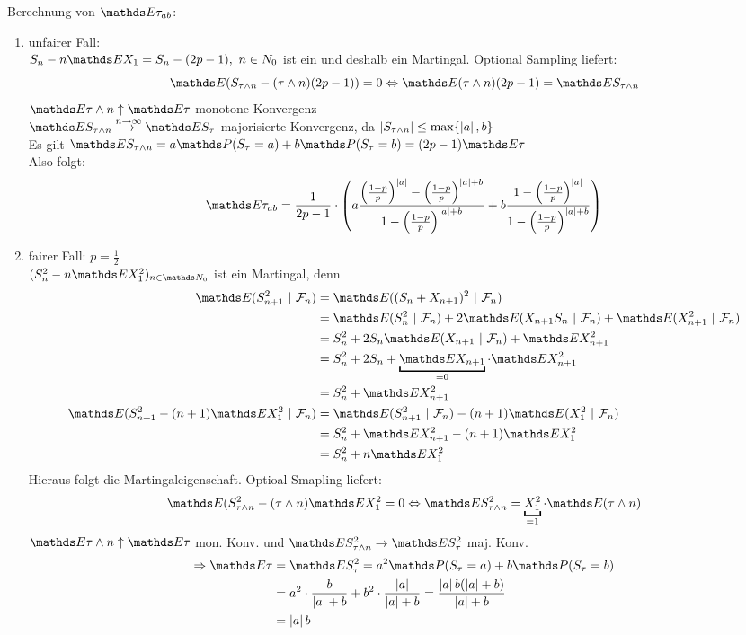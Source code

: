 \begin{enumerate}
	Berechnung von $\E \tau_{ab}$:\\
	\begin{enumerate}[(1)]
		\item unfairer Fall:\\
		$S_n-n\E X_1= S_n-(2p-1),~n\in N_0$ ist ein  und deshalb ein Martingal. Optional Sampling liefert:
		\[
		\E(S_{\tau\land n}-(\tau\land n)(2p-1))=0 \Leftrightarrow \E(\tau\land n)(2p-1)=\E S_{\tau\land n} 
		\]
		$\E \tau\land n \uparrow \E\tau$ monotone Konvergenz\\
		$\E S_{\tau\land n}\stackrel{\tiny n\to\infty}{\to} \E S_\tau$ majorisierte Konvergenz, da $\left\vert S_{\tau\land n}\right\vert\le \max\{\left\vert a\right\vert,b \}$\\
		Es gilt $\E S_{\tau\land n}=a\Pw(S_\tau=a)+b\Pw(S_\tau=b)=(2p-1)\E \tau$\\
		Also folgt:
		\[
		\E\tau_{ab}= \frac{1}{2p-1}\cdot \enbrace{a\frac{\enbrace{\frac{1-p}{p}}^{\abs{a}}-\enbrace{\frac{1-p}{p}}^{\abs{a}+b}}{1-\enbrace{\frac{1-p}{p}}^{\abs{a}+b}}+ b\frac{1-\enbrace{\frac{1-p}{p}}^{\abs{a}}}{1-\enbrace{\frac{1-p}{p}}^{\abs{a}+b}}} 
		\]
		\item fairer Fall: $p=\frac{1}{2}$\\
		$(S_n^2-n\E X_1^2)_{n\in \N_0}$ ist ein Martingal, denn
		\begin{equation*}
		\begin{aligned}
			\E(S_{n+1}^2~|~\F_n) &= \E((S_n+X_{n+1})^2~|~\F_n)\\
			&= \E(S_n^2~|~\F_n)+2\E(X_{n+1}S_n~|~\F_n)+\E(X_{n+1}^2~|~\F_n)\\
			&= S_n^2+ 2S_n\E(X_{n+1}~|~\F_n)+ \E X_{n+1}^2\\
			&= S_n^2+ 2S_n+\underbracket{\E X_{n+1}}_{=0}\cdot \E X_{n+1}^2\\
			&= S_n^2+ \E X_{n+1}^2\\
			\E(S_{n+1}^2-(n+1)\E X_1^2~|~\F_n)
			&= \E(S_{n+1}^2~|~\F_n)-(n+1)\E(X_1^2~|~\F_n)\\
			&=S_n^2+\E X_{n+1}^2-(n+1)\E X_1^2\\
			&=S_n^2+n\E X_1^2
		\end{aligned}
		\end{equation*}
		Hieraus folgt die Martingaleigenschaft. Optioal Smapling liefert: 
		\[
		\E(S_{\tau\land n}^2-(\tau\land n)\E X_1^2=0 \Leftrightarrow \E S_{\tau\land n}^2= \underbracket{X_1^2}_{=1}\cdot \E(\tau\land n)
		\]
		$\E \tau\land n\uparrow \E\tau$ mon. Konv. und $\E S_{\tau\land n}^2 \to \E S_\tau^2$ maj. Konv.\\
		\begin{equation*}
		\begin{aligned}
			\Rightarrow \E\tau &= \E S_\tau^2 = a^2\Pw(S_\tau=a)+b\Pw(S_\tau=b)\\
			&= a^2\cdot \frac{b}{\abs{a}+b}+b^2\cdot \frac{\abs{a}}{\abs{a}+b}=\frac{\abs{a}b(\abs{a}+b)}{\abs{a}+b}\\
			&= \abs{a}b
		\end{aligned}
		\end{equation*}
		\end{enumerate}
\end{enumerate}

